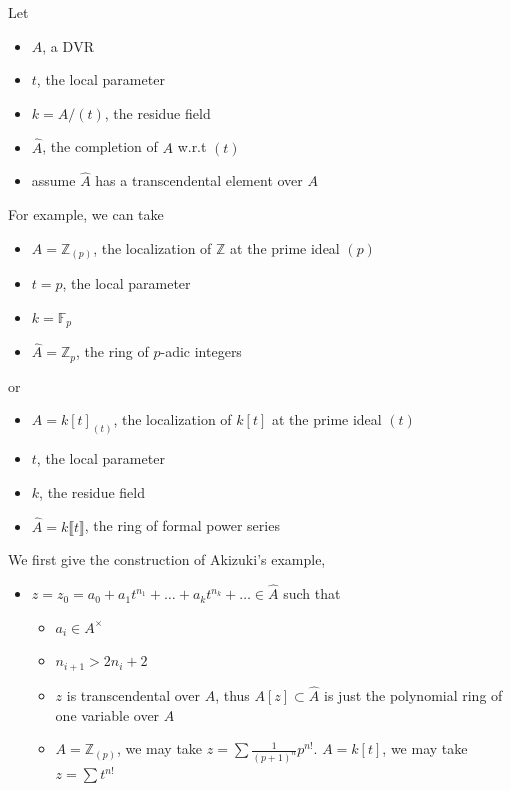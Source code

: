 \documentclass[../main.tex]{subfiles}
\begin{document}
\begin{example}
Let 
\begin{itemize}
\item $A$, a $\mathrm{DVR}$
\item $t$, the local parameter
\item $k=A/(t)$, the residue field
\item $\hat{A}$, the completion of $A$ w.r.t $(t)$
\item assume $\hat{A}$ has a transcendental element over $A$
\end{itemize}
For example, we can take
\begin{itemize}
\item $A=\mathbb{Z}_{(p)}$, the localization of $\mathbb{Z}$ at the prime ideal $(p)$
\item $t=p$, the local parameter
\item $k=\mathbb{F}_{p}$
\item $\hat{A}=\mathbb{Z}_{p}$, the ring of $p$-adic integers
\end{itemize}
or
\begin{itemize}
\item $A=k[t]_{(t)}$, the localization of $k[t]$ at the prime ideal $(t)$
\item $t$, the local parameter
\item $k$, the residue field
\item $\hat{A}=k\llbracket t\rrbracket$, the ring of formal power series
\end{itemize}
We first give the construction of Akizuki's example,
\begin{itemize}
\item $z=z_{0}=a_{0}+a_{1}t^{n_{1}}+\dots + a_{k}t^{n_{k}}+\dots \in \hat{A}$ such that 
\begin{itemize}
\item $a_{i}\in A^{\times}$
\item $n_{i+1}>2n_{i}+2$
\item $z$ is transcendental over $A$, thus $A[z]\subset \hat{A}$ is just the polynomial ring of one variable over $A$
\item $A=\mathbb{Z}_{(p)}$, we may take $z=\sum\frac{1}{(p+1)^{n}}p^{n!}$. $A=k[t]$, we may take $z=\sum t^{n!}$
\end{itemize}


\end{itemize}
\end{example}
\end{document}
